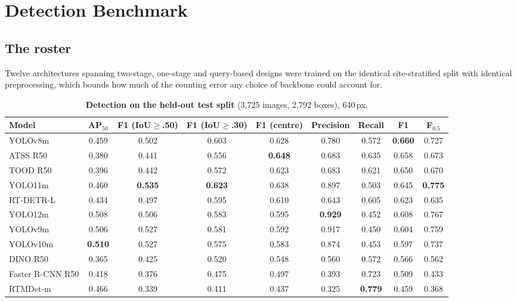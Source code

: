 \section{Detection Benchmark}
\label{sec:detection}

\subsection{The roster}

Twelve architectures spanning two-stage, one-stage and query-based designs were trained on
the identical site-stratified split with identical preprocessing, which bounds how much of
the counting error any choice of backbone could account for.

\begin{table}[t]
\centering\small
\setlength{\tabcolsep}{4.5pt}
\begin{tabular}{lcccccccc}
\toprule
Model & AP$_{50}$ & F1 (IoU$\geq$.50) & F1 (IoU$\geq$.30) & F1 (centre) & Precision & Recall & F1 & F$_{0.5}$ \\
\midrule
YOLOv8m & 0.459 & 0.502 & 0.603 & 0.628 & 0.780 & 0.572 & \textbf{0.660} & 0.727 \\
ATSS R50 & 0.380 & 0.441 & 0.556 & \textbf{0.648} & 0.683 & 0.635 & 0.658 & 0.673 \\
TOOD R50 & 0.396 & 0.442 & 0.572 & 0.623 & 0.683 & 0.621 & 0.650 & 0.670 \\
YOLO11m & 0.460 & \textbf{0.535} & \textbf{0.623} & 0.638 & 0.897 & 0.503 & 0.645 & \textbf{0.775} \\
RT-DETR-L & 0.434 & 0.497 & 0.595 & 0.610 & 0.643 & 0.605 & 0.623 & 0.635 \\
YOLO12m & 0.508 & 0.506 & 0.583 & 0.595 & \textbf{0.929} & 0.452 & 0.608 & 0.767 \\
YOLOv9m & 0.506 & 0.527 & 0.581 & 0.592 & 0.917 & 0.450 & 0.604 & 0.759 \\
YOLOv10m & \textbf{0.510} & 0.527 & 0.575 & 0.583 & 0.874 & 0.453 & 0.597 & 0.737 \\
DINO R50 & 0.365 & 0.425 & 0.520 & 0.548 & 0.560 & 0.572 & 0.566 & 0.562 \\
Faster R-CNN R50 & 0.418 & 0.376 & 0.475 & 0.497 & 0.393 & 0.723 & 0.509 & 0.433 \\
RTMDet-m & 0.466 & 0.339 & 0.411 & 0.437 & 0.325 & \textbf{0.779} & 0.459 & 0.368 \\
\bottomrule
\end{tabular}
\caption{\textbf{Detection on the held-out test split} (3,725 images, 2,792 boxes), 640\,px,
}
\end{table}

